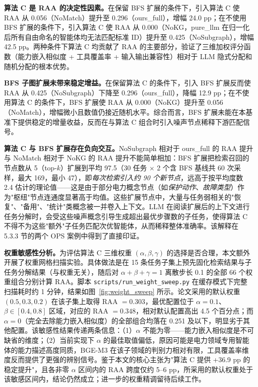 \textbf{算法 C 是 RAA 的决定性因素。}在保留 BFS 扩展的条件下，引入算法 C 使 RAA 从 0.056（NoMatch）提升至 0.296（ours\_full），增幅 24.0 pp；在不使用 BFS 扩展的条件下，引入算法 C 使 RAA 从 0.000（NoKG，pure\_llm 在归一化后所有自由命名的智能体均无法匹配标准 ID）提升至 0.425（NoSubgraph），增幅 42.5 pp。两种条件下算法 C 均贡献了 RAA 的主要部分，验证了三维加权评分函数（能力嵌入相似度 + 工具覆盖率 + 输入输出兼容性）相对于 LLM 隐式分配和随机分配的根本优势。

\textbf{BFS 子图扩展未带来稳定增益。}在保留算法 C 的条件下，引入 BFS 扩展反而使 RAA 从 0.425（NoSubgraph）下降至 0.296（ours\_full），降幅 12.9 pp；在不使用算法 C 的条件下，BFS 扩展使 RAA 从 0.000（NoKG）提升至 0.056（NoMatch），增幅微小且数值仍接近随机水平。综合而言，BFS 扩展未能在本基准下提供稳定的增量收益，反而在与算法 C 组合时引入噪声节点稀释下游匹配信号。

\textbf{算法 C 与 BFS 扩展存在负向交互。}NoSubgraph 相对于 ours\_full 的 RAA 提升与 NoMatch 相对于 NoKG 的 RAA 提升不能简单相加：BFS 扩展把检索召回的节点数从 5（top-$k$）扩展到平均 97.5（30 任务 $\times$ 2 个含 BFS 基线共 60 次采样，最大 169，最小 47），即\emph{每次检索引入约 90 个新节点}，远高于按平均度数 2.4 估计的理论值——这是由于部分电力概念节点（如\emph{保护动作}、\emph{故障类型}）作为"枢纽"节点连通度显著高于均值。这些扩展节点中，大量与任务弱相关的"恢复"、"备用"、"统计"类概念被一并卷入上下文。LLM 在阅读扩展后的上下文进行任务分解时，会受这些噪声概念引导生成超出最优步骤数的子任务，使得算法 C 不得不为这些"额外"子任务匹配次优智能体，从而稀释整体准确率。该解释在 5.3.3 节的两个 OPS 案例中得到了直接印证。

\textbf{权重敏感性分析。}为评估算法 C 三维权重 $(\alpha, \beta, \gamma)$ 的选择是否合理，本文额外开展了权重网格扫描实验。具体做法是在 15 条任务子集上预先固化检索结果与子任务分解结果（与权重无关），随后对 $\alpha + \beta + \gamma = 1$ 离散步长 0.1 的全部 66 个权重组合分别计算 RAA。脚本 \texttt{scripts/run\_weight\_sweep.py} 在缓存模式下完整扫描耗时约 1 分钟，结果如图~\ref{fig:weight_sweep} 所示。论文采用的默认权重 $(0.5, 0.3, 0.2)$ 在该子集上取得 RAA $=0.303$，最优配置位于 $\alpha = 0.1$、$\beta \in [0.4, 0.8]$ 区域，对应的 RAA $= 0.348$，相对默认配置高出 4.5 个百分点；而 $\alpha = 0$（完全去除能力嵌入相似度）的全部组合均落在 0.251 及以下，明显劣于其他配置。该敏感性结果传递两条信息：（1）$\alpha$ 不能为零——能力嵌入相似度是不可缺省的维度；（2）当前实现下 $\alpha$ 的最佳取值偏低，原因可能是电力领域专用智能体的能力描述高度同质，BGE-M3 在该子领域的判别力相对有限，工具覆盖率维度反而提供了更强的辨别信号。鉴于本文的核心主张为"算法 C 提供 +36.9 pp 的稳定提升"，且各非零 $\alpha$ 区间内的 RAA 跨度仅约 5--6 pp，所采用的默认权重处于该敏感区间内，结论仍然成立；进一步的权重精调留待后续工作。

